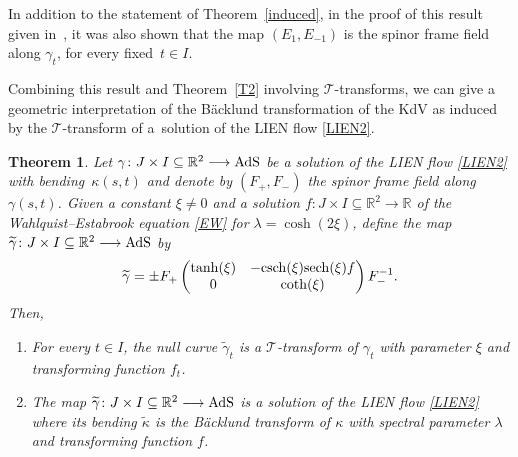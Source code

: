 \documentclass[pdftex]{sigma}
\numberwithin{equation}{section}
\newtheorem{Theorem}{Theorem}[section]
\def\bending{\kappa}
\def\R{\mathbb{R}}
\def\AdS{{\rm AdS}}
\def\sech{{\rm sech}}
\def\csch{{\rm csch}}
\begin{document}
\begin{Remark}\label{new}
	In addition to the statement of Theorem~\ref{induced}, in the proof of this result given in~\cite{MP}, it was also shown that the map $(E_1,E_{-1})$ is the spinor frame field along $\gamma_t$, for every fixed~${t\in I}$.
\end{Remark}

Combining this result and Theorem~\ref{T2} involving $\mathcal{T}$-transforms, we can give a geometric interpretation of the B\"{a}cklund transformation of the KdV as induced by the $\mathcal{T}$-transform of a~solution of the LIEN flow \eqref{LIEN2}.

\begin{Theorem}\label{T4} Let $\gamma\colon J\times I\subseteq\R^2\longrightarrow\AdS$ be a solution of the LIEN flow \eqref{LIEN2} with bending~$\bending(s,t)$ and denote by $(F_+,F_-)$ the spinor frame field along $\gamma(s,t)$. Given a constant $\xi\neq0$ and a solution $f\colon J\times I\subseteq\R^2\longrightarrow\R$ of the Wahlquist--Estabrook equation \eqref{EW} for $\lambda=\cosh(2\xi)$, define the map $\widetilde{\gamma}\colon J\times I\subseteq\R^2\longrightarrow\AdS$ by
	\begin{equation}\label{TLIEN}
		\widetilde{\gamma}=\pm F_+\begin{pmatrix} \tanh(\xi) & -\csch(\xi)\sech(\xi)f \\ 0 & \coth(\xi) \end{pmatrix} F_-^{-1}.
	\end{equation}
	Then,
	\begin{enumerate}\itemsep=0pt
		\item[$1.$] For every $t\in I$, the null curve $\widetilde{\gamma}_t$ is a $\mathcal{T}$-transform of $\gamma_t$ with parameter $\xi$ and transforming function $f_t$.
		\item[$2.$] The map $\widetilde{\gamma}\colon J\times I\subseteq\R^2\longrightarrow\AdS$ is a solution of the LIEN flow \eqref{LIEN2} where its bending $\widetilde{\bending}$ is the B\"{a}cklund transform of $\bending$ with spectral parameter $\lambda$ and transforming function $f$.
	\end{enumerate}
\end{Theorem}
\end{document}

